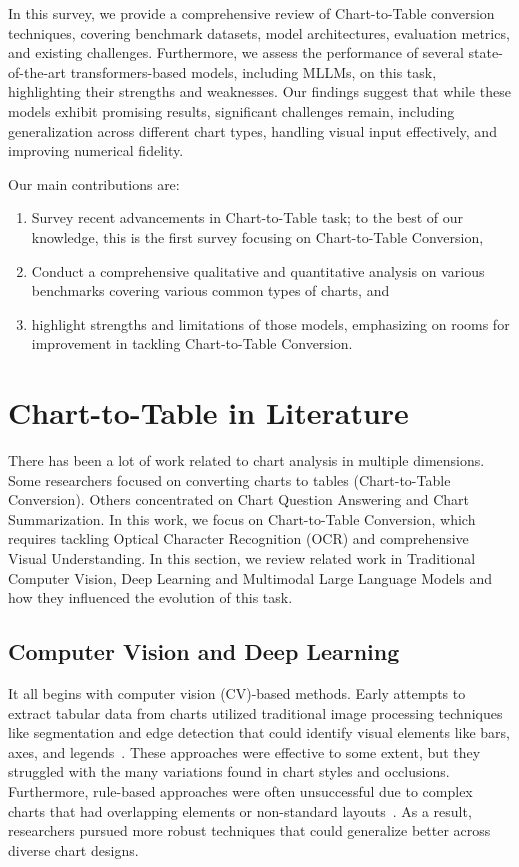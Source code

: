 \documentclass[
	letterpaper, %
]{jdf}
\begin{document}
In this survey, we provide a comprehensive review of Chart-to-Table conversion techniques, covering benchmark datasets, model architectures, evaluation metrics, and existing challenges.
Furthermore, we assess the performance of several state-of-the-art transformers-based models, including MLLMs, on this task, highlighting their strengths and weaknesses.
Our findings suggest that while these models exhibit promising results, significant challenges remain, including generalization across different chart types, handling visual input effectively, and improving numerical fidelity.

Our main contributions are:
\begin{enumerate}
     \item Survey recent advancements in Chart-to-Table task; to the best of our knowledge, this is the first survey focusing on Chart-to-Table Conversion,
     \item Conduct a comprehensive qualitative and quantitative analysis on various benchmarks covering various common types of charts, and
     \item highlight strengths and limitations  of those models, emphasizing on rooms for improvement in tackling Chart-to-Table Conversion.
       \end{enumerate}

\section{Chart-to-Table in Literature}\label{sect:literature}
There has been a lot of work related to chart analysis in multiple dimensions.
Some researchers focused on converting charts to tables (Chart-to-Table Conversion).
Others concentrated on Chart Question Answering and Chart Summarization.
In this work, we focus on Chart-to-Table Conversion, which requires tackling Optical Character Recognition (OCR) and comprehensive Visual Understanding.
In this section, we review related work in Traditional Computer Vision, Deep Learning and Multimodal Large Language Models and how they influenced the evolution of this task.

\subsection{Computer Vision and Deep Learning}\label{ssect:cv-and-dl}
    It all begins with computer vision (CV)-based methods.
    Early attempts to extract tabular data from charts utilized traditional image processing techniques like segmentation and edge detection that could identify visual elements like bars, axes, and legends~\cite{sreevalsan2021tensor}.
    These approaches were effective to some extent, but they struggled with the many variations found in chart styles and occlusions.
    Furthermore, rule-based approaches were often unsuccessful due to complex charts that had overlapping elements or non-standard layouts~\cite{poco2017reverse}.
    As a result, researchers pursued more robust techniques that could generalize better across diverse chart designs.
\end{document}
